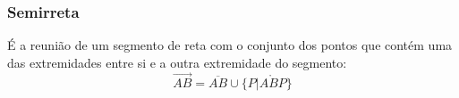     \subsubsection{Semirreta}
        É a reunião de um segmento de reta com o conjunto dos pontos que contém uma das extremidades entre si e a outra extremidade do segmento:
        \[ \overrightarrow{AB} = \overline{AB} \cup \{ P | \mathring{ABP} \} \]
        \begin{center}
        \end{center}
